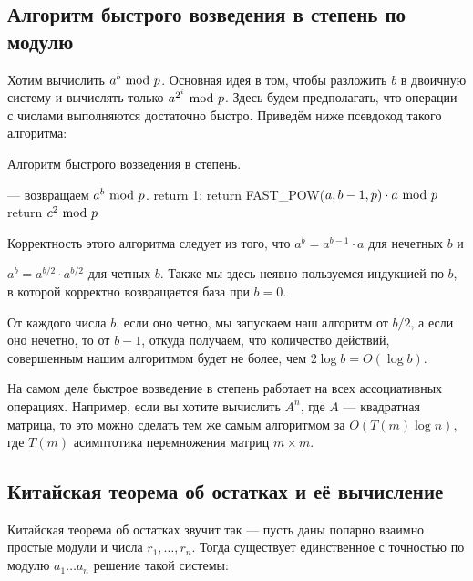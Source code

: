 \documentclass[a4paper, 12pt]{article}
\begin{document}
\subsection{Алгоритм быстрого возведения в степень по модулю}

Хотим вычислить $a^b \ \text{mod} \  p$. Основная идея в том, чтобы разложить $b$ в двоичную
систему и вычислять только $a^{2^i} \ \text{mod} \  p$. Здесь будем
предполагать, что операции с числами выполняются достаточно быстро.
Приведём ниже псевдокод такого алгоритма:

\begin{algorithm}
  \caption{Алгоритм быстрого возведения в степень.}
  \begin{algorithmic}[1]
     \Comment --- возвращаем $a^b \ \text{mod} \  p$.
      \State return 1;
    \EndIf
      \State return FAST\_POW($a, b - 1, p) \cdot a \ \text{mod} \  p$
    \Else
      \State return $c^2 \ \text{mod} \  p$
    \EndIf
    \EndFunction
  \end{algorithmic}
\end{algorithm}  

Корректность этого алгоритма следует из того, что $a^b = a^{b - 1}\cdot a$ 
для нечетных $b$ и 

$a^b = a^{b/2} \cdot a^{b/2}$ для четных $b$. Также мы
здесь неявно пользуемся индукцией по $b$, в которой корректно возвращается база при $b = 0$.

От каждого числа $b$, если оно четно, мы запускаем наш алгоритм от $b/2$, а если
оно нечетно, то от $b - 1$, откуда получаем, что количество
действий, совершенным нашим алгоритмом будет не более, чем $2\log b = O(\log b)$.

\begin{Commentary}
  На самом деле быстрое возведение в степень работает на всех ассоциативных операциях.
  Например, если вы хотите вычислить $A^n$, где $A$ --- квадратная матрица, то
  это можно сделать тем же самым алгоритмом
  за $O(T(m)\log n)$, где $T(m)$ асимптотика перемножения
  матриц $m \times m$.
\end{Commentary}

\subsection{Китайская теорема об остатках и её вычисление}

Китайская теорема об остатках звучит так --- пусть даны попарно взаимно простые
модули и числа $r_1, \ldots, r_n$. Тогда существует единственное с точностью по
модулю $a_1 \ldots a_n$ решение такой системы:
\end{document}
